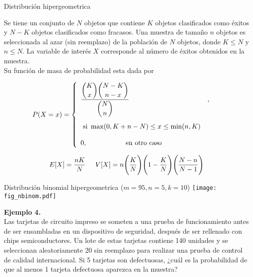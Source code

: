 \documentclass[base=hide,12pt]{elegantbook}
\begin{document}
\begin{Box2}{Distribución hipergeometrica}
	
	Se tiene un conjunto de $N$ objetos que contiene $K$ objetos clasificados como éxitos y $N-K$ objetos clasificados como fracasos. Una muestra de tamaño $n$ objetos es seleccionada al azar (sin reemplazo) de la población de $N$ objetos, donde $K \leq N$ y $n \leq N $. La variable de interés $X$ corresponde al número de éxitos obtenidos en la muestra. \\
	
	Su función de masa de probabilidad esta dada por 
	
	\begin{equation*}
		P(X=x)=\left\lbrace
		\begin{array}{lll}
			\dfrac{\displaystyle\binom{K}{x} \displaystyle\binom{N-K}{n-x}}{\displaystyle\binom{N}{n}} \vspace{.3cm} &,\\ 
			{\text{ si }\max(0,K+n-N) \leq x \leq \min(n,K) }&   \\
			&&\\
			0, \hspace{2cm}  \mbox{en otro caso}
		\end{array}
		\right.
	\end{equation*}
	
	$$E[X]=\dfrac{nK}{N} \hspace{.5cm} V[X]=n\Bigg(\frac{K}{N}\Bigg) \Bigg(1-\dfrac{K}{N}\Bigg)\Bigg(\dfrac{N-n}{N-1}\Bigg)$$
	
\end{Box2}
\begin{center}
	Distribución binomial hipergeometrica ($m=95, n=5, k=10$)
	\texttt{[image: fig\_nbinom.pdf]}
\end{center} 

\vspace{.5cm} 
\textcolor{col3}{\bf \large  Ejemplo 4.} \\
Las tarjetas de circuito impreso se someten a una prueba de funcionamiento antes de ser ensambladas en un dispositivo de seguridad, después de ser rellenado con chips semiconductores. Un lote de estas tarjetas contiene 140 unidades y se seleccionan aleatoriamente 20 sin reemplazo para realizar una prueba de control de calidad internacional. Si 5 tarjetas son defectuosas, ¿cuál es la probabilidad de que al menos 1 tarjeta defectuosa aparezca en la muestra?
\end{document}
